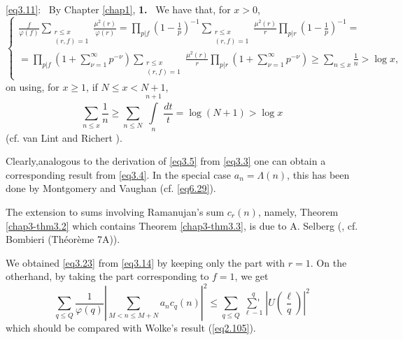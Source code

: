 \eqref{eq3.11}:~ By Chapter \ref{chap1}, {\bf 1.}~ We have that, for $x > 0$, 
{\fontsize{10pt}{12pt}\selectfont
\begin{equation*}
\begin{cases}
\frac{f} {\varphi(f)} \sum_{\substack{r \le x \\ (r,f)=1}} \frac{\mu^2(r)}{\varphi(r)} =\prod_{p|f} (1-\frac{1}{p})^{-1} \sum_{\substack{r \le x \\ (r,f)=1}} \frac{\mu^2(r)}{r} \prod_{p|r}(1-\frac{1}{p})^{-1}=\\
= \prod_{p|f} (1+ \sum^{\infty}_{\nu =1} p^{-\nu}) \sum_{\substack {r
    \le x \\(r,f)=1}} \frac{\mu^2 (r)} {r} \prod_{p|r} (1+
\sum^{\infty}_{\nu =1} p^{-\nu}) \ge \sum_{n \le x} \frac{1}{n} > \log
x,  
\end{cases}\tag{3.26}\label{eq3.26} 
\end{equation*}}\relax
on using, for $x \geq 1$, if $N \leq x < N + 1$,
\begin{equation*}
\sum_{n \leq x} \frac{1}{n} \geq \sum_{n \leq N} \int\limits_n^{n+1} \frac{dt}{t} = \log (N+1) > \log x  \tag{3.27}\label{eq3.27}
\end{equation*}
(cf. van Lint and Richert \cite{key1}).

Clearly,\pageoriginale analogous to the derivation of \eqref{eq3.5} from
\eqref{eq3.3} one can 
obtain a corresponding result from \eqref{eq3.4}. In the special case $a_n =
\Lambda (n)$, this has been done by Montgomery and Vaughan
       \cite{key2} (cf. \eqref{eq6.29}).  

The extension to sums involving Ramanujan's sum $c_r(n)$, namely,
Theorem \ref{chap3-thm3.2} which contains Theorem \ref{chap3-thm3.3},
is due to A. Selberg (\cite{key6}, cf. Bombieri \cite{key6}
(Th\'eor\`eme 7A)).  

We obtained \eqref{eq3.23} from \eqref{eq3.14} by keeping only the
part with $r = 1$. On the otherhand, by taking the part corresponding
to $f = 1$, we get 
\begin{equation*}
\sum_{q \leq Q} \frac{1}{\varphi (q)}| \sum_{M < n \leq M+N} a_n c_q
(n)|^2 \leq  \sum_{q\leq Q} \mathop{\sum{}'}\limits_{\ell -1}^q |U
(\frac{\ell}{q})|^2 \tag{3.28}\label{eq3.28} 
 \end{equation*} 
which should be compared with Wolke's result (\eqref{eq2.105}).
 
